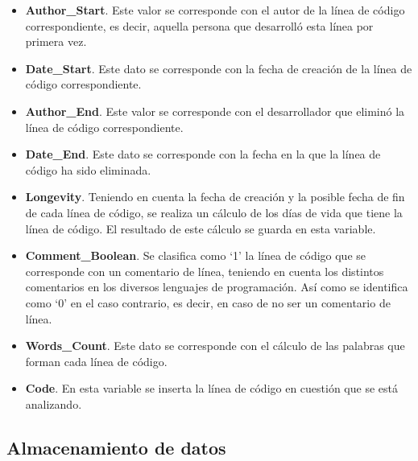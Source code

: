 \documentclass[a4paper, 12pt]{book}
\begin{document}
\begin{itemize}
  \item \textbf{Author\_Start}. Este valor se corresponde con el autor de la línea de código correspondiente, es decir, aquella persona que desarrolló esta línea por primera vez.
  \item \textbf{Date\_Start}. Este dato se corresponde con la fecha de creación de la línea de código correspondiente.
  \item \textbf{Author\_End}. Este valor se corresponde con el desarrollador que eliminó la línea de código correspondiente.
  \item \textbf{Date\_End}.   Este dato se corresponde con la fecha en la que la línea de código ha sido eliminada.
  \item \textbf{Longevity}. Teniendo en cuenta la fecha de creación y la posible fecha de fin de cada línea de código, se realiza un cálculo de los días de vida que tiene la línea de código. El resultado de este cálculo se guarda en esta variable.
  \item \textbf{Comment\_Boolean}. Se clasifica como `1' la línea de código que se corresponde con un comentario de línea, teniendo en cuenta los distintos comentarios en los diversos lenguajes de programación. Así como se identifica como `0' en el
  caso contrario, es decir, en caso de no ser un comentario de línea.
  \item \textbf{Words\_Count}. Este dato se corresponde con el cálculo de las palabras que forman cada línea de código. 
  \item \textbf{Code}. En esta variable se inserta la línea de código en cuestión que se está analizando.
\end{itemize}

\subsection{Almacenamiento de datos}
\label{subsec:almacenamiento}
\end{document}
